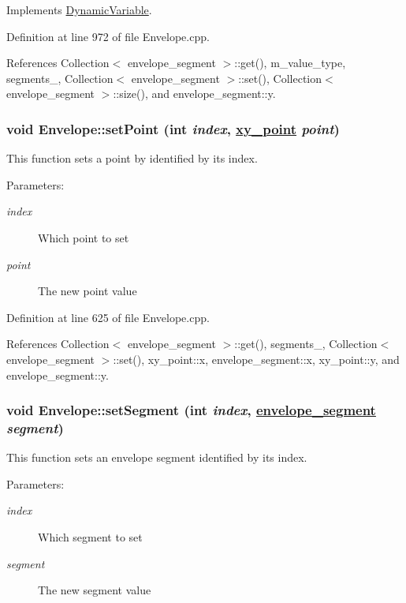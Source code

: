 Implements \hyperlink{classDynamicVariable_a4}{Dynamic\-Variable}.

Definition at line 972 of file Envelope.cpp.

References Collection$<$ envelope\_\-segment $>$::get(), m\_\-value\_\-type, segments\_\-, Collection$<$ envelope\_\-segment $>$::set(), Collection$<$ envelope\_\-segment $>$::size(), and envelope\_\-segment::y.\hypertarget{classEnvelope_a16}{
\subsubsection[setPoint]{\setlength{\rightskip}{0pt plus 5cm}void Envelope::set\-Point (int {\em index}, \hyperlink{structxy__point}{xy\_\-point} {\em point})}}
\label{classEnvelope_a16}


This function sets a point by identified by its index. \begin{Desc}
\item[Parameters:]
\begin{description}
\item[{\em index}]Which point to set \item[{\em point}]The new point value \end{description}
\end{Desc}


Definition at line 625 of file Envelope.cpp.

References Collection$<$ envelope\_\-segment $>$::get(), segments\_\-, Collection$<$ envelope\_\-segment $>$::set(), xy\_\-point::x, envelope\_\-segment::x, xy\_\-point::y, and envelope\_\-segment::y.\hypertarget{classEnvelope_a14}{
\subsubsection[setSegment]{\setlength{\rightskip}{0pt plus 5cm}void Envelope::set\-Segment (int {\em index}, \hyperlink{structenvelope__segment}{envelope\_\-segment} {\em segment})}}
\label{classEnvelope_a14}


This function sets an envelope segment identified by its index. \begin{Desc}
\item[Parameters:]
\begin{description}
\item[{\em index}]Which segment to set \item[{\em segment}]The new segment value \end{description}
\end{Desc}


